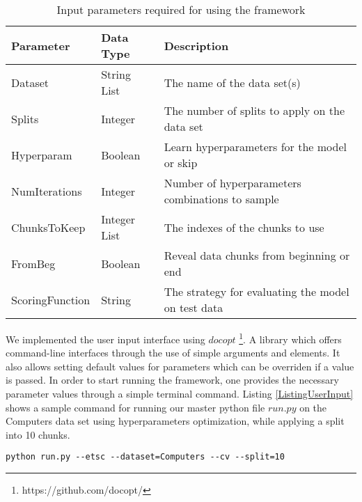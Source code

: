 \begin{table}[hbt!]
  \setlength\extrarowheight{2pt} %
  \begin{tabularx}{\textwidth}{|X|X|X|}
  \hline
  \textbf{Parameter} & \textbf{Data Type} & \textbf{Description} \\ \hline
    Dataset         & String List        & The name of the data set(s)                        \\ \hline
    Splits          & Integer            & The number of splits to apply on the data set      \\ \hline
    Hyperparam      & Boolean            & Learn hyperparameters for the model or skip        \\ \hline
    NumIterations   & Integer            & Number of hyperparameters combinations to sample   \\ \hline
    ChunksToKeep    & Integer List       & The indexes of the chunks to use                   \\ \hline
    FromBeg         & Boolean            & Reveal data chunks from beginning or end           \\ \hline
    ScoringFunction & String             & The strategy for evaluating the model on test data \\ \hline
  \end{tabularx}
  \caption{Input parameters required for using the framework}
  \label{TableUserInput}
\end{table}

We implemented the user input interface using $docopt$ \footnote{https://github.com/docopt/}. A library which offers command-line interfaces through
the use of simple arguments and elements. It also allows setting default values for parameters which can be overriden if a value is passed.
In order to start running the framework, one provides the necessary parameter values through a simple terminal command.
Listing \ref{ListingUserInput} shows a sample command for running our master python file $run.py$ on the Computers data set using hyperparameters optimization,
while applying a split into 10 chunks.

\lstset{basicstyle=\ttfamily\small}
\begin{lstlisting}[language=Comsol,caption={Sample command for providing user input to the framework},captionpos=b,label={ListingUserInput}]
  python run.py --etsc --dataset=Computers --cv --split=10
\end{lstlisting}

